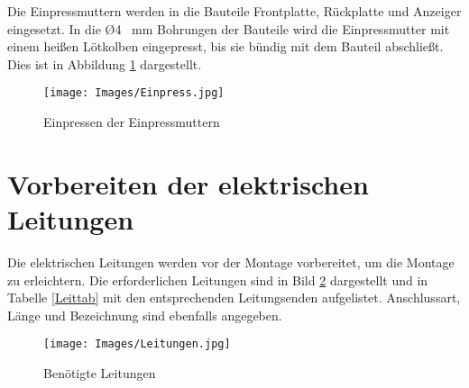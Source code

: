 Die Einpressmuttern werden in die Bauteile Frontplatte, Rückplatte und Anzeiger eingesetzt. In die \O 4 \ mm Bohrungen der Bauteile wird die Einpressmutter mit einem heißen Lötkolben eingepresst, bis sie bündig mit dem Bauteil abschließt. Dies ist in Abbildung \ref{Einpress} dargestellt.

\begin{figure}[H]
	\begin{center}
		\texttt{[image: Images/Einpress.jpg]}
		\caption{Einpressen der Einpressmuttern} \label{Einpress}
	\end{center}
\end{figure}

\section{Vorbereiten der elektrischen Leitungen}

Die elektrischen Leitungen werden vor der Montage vorbereitet, um die Montage zu erleichtern. Die erforderlichen Leitungen sind in Bild \ref{Leitungen} dargestellt und in Tabelle \ref{Leittab} mit den entsprechenden Leitungsenden aufgelistet. Anschlussart, Länge und Bezeichnung sind ebenfalls angegeben.

\begin{figure}[H]
	\begin{center}
		\texttt{[image: Images/Leitungen.jpg]}
		\caption{Benötigte Leitungen} \label{Leitungen}
	\end{center}
\end{figure}


